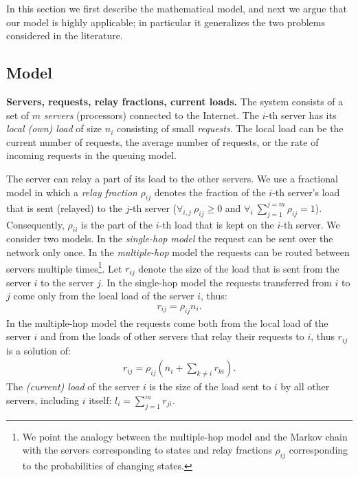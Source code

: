 \documentclass[11pt]{article}
\begin{document}
In this section we first describe the mathematical model, and next we argue that our model is highly applicable; in particular it generalizes the two problems considered in the literature.

\subsection{Model}\label{sec:mathematical-model}

\noindent
\textbf{Servers, requests, relay fractions, current loads.}\quad
The system consists of a set of $m$ \emph{servers} (processors) connected to the Internet. The $i$-th server has its \emph{local (own) load} of size $n_{i}$ 
consisting of small \emph{requests}. The local load can be the current number of requests, the average number of requests, or the rate of incoming requests in the queuing model.

The server can relay a part of its load to the other servers. We use a fractional model in which a \emph{relay fraction} $\rho_{ij}$ denotes the fraction of the $i$-th server's load that is sent (relayed) to the $j$-th server ($\forall_{i,j} \: \rho_{ij} \geq 0$ and $\forall _{i} \: \sum_{j = 1}^{j = m}\rho_{ij} = 1$). Consequently, $\rho_{ii}$ is the part of the $i$-th load that is kept on the $i$-th server. We consider two models. In the \emph{single-hop model} the request can be sent over the network only once. In the \emph{multiple-hop} model the requests can be routed between servers multiple times\footnote{We point the analogy between the multiple-hop model and the Markov chain with the servers corresponding to states and relay fractions $\rho_{ij}$ corresponding to the probabilities of changing states.}. Let $r_{ij}$ denote the size of the load that is sent from the server $i$ to the server $j$. In the single-hop model the requests transferred from $i$ to $j$ come only from the local load of the server $i$, thus:
\begin{align}
r_{ij} = \rho_{ij}n_i \textrm{.}
\end{align}
In the multiple-hop model the requests come both from the local load of the server $i$ and from the loads of other servers that relay their requests to $i$, thus $r_{ij}$ is a solution of:
\begin{align}
r_{ij} = \rho_{ij}\left(n_i + \sum_{k \neq i}r_{ki}\right) \textrm{.}
\end{align}
The \emph{(current) load} of the server $i$ is the size of the load sent to $i$ by all other servers, including $i$ itself:
$l_i = \sum_{j = 1}^{m}r_{ji} \textrm{.}$
\medskip
\end{document}
